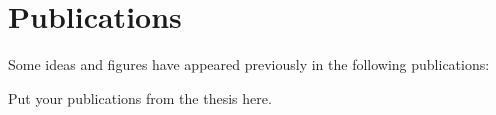 \chapter*{Publications}
Some ideas and figures have appeared previously in the following publications:

\bigskip

\noindent Put your publications from the thesis here.